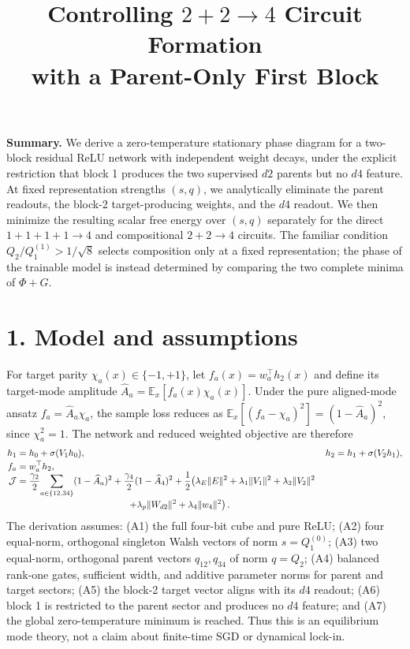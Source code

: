 \documentclass[10pt]{article}
\title{\vspace{-1.3cm}\textbf{Controlling $2+2\!\to\!4$ Circuit Formation\\
with a Parent-Only First Block}}
\author{}
\date{\vspace{-1.15cm}}
\begin{document}
\maketitle
\vspace{-0.75cm}

\textbf{Summary.}
We derive a zero-temperature stationary phase diagram for a two-block residual ReLU network
with independent weight decays, under the explicit restriction that block 1 produces the two
supervised $d2$ parents but no $d4$ feature.  At fixed representation strengths $(s,q)$, we
analytically eliminate the parent readouts, the block-2 target-producing weights, and the $d4$
readout.  We then minimize the resulting scalar free energy over $(s,q)$ separately for the
direct $1+1+1+1\to4$ and compositional $2+2\to4$ circuits.  The familiar condition
$Q_2/Q_1^{(1)}>1/\sqrt8$ selects composition only at a fixed representation; the phase of the
trainable model is instead determined by comparing the two complete minima of $\Phi+G$.

\section*{1. Model and assumptions}
For target parity $\chi_a(x)\in\{-1,+1\}$, let $f_a(x)=w_a^\top h_2(x)$ and define its
target-mode amplitude $\widehat A_a=\mathbb E_x[f_a(x)\chi_a(x)]$.  Under the pure aligned-mode
ansatz $f_a=\widehat A_a\chi_a$, the sample loss reduces as
$\mathbb E_x[(f_a-\chi_a)^2]=(1-\widehat A_a)^2$, since $\chi_a^2=1$.  The network and
reduced weighted objective are therefore
\begin{align}
h_1&=h_0+\sigma(V_1h_0),& h_2&=h_1+\sigma(V_2h_1),\nonumber\\[-2pt]
f_a&=w_a^\top h_2,\nonumber\\[-5pt]
\mathcal J&=\frac{\gamma_2}{2}\!\sum_{a\in\{12,34\}}(1-\widehat A_a)^2
+\frac{\gamma_4}{2}(1-\widehat A_4)^2
+\frac12\!\left(\lambda_E\|E\|^2+\lambda_1\|V_1\|^2+\lambda_2\|V_2\|^2\right.\nonumber\\[-2pt]
&\hspace{4.2cm}\left.+\lambda_p\|W_{d2}\|^2+\lambda_4\|w_4\|^2\right).
\label{eq:objective}
\end{align}
The derivation assumes: (A1) the full four-bit cube and pure ReLU; (A2) four equal-norm,
orthogonal singleton Walsh vectors of norm $s=Q_1^{(0)}$; (A3) two equal-norm, orthogonal
parent vectors $q_{12},q_{34}$ of norm $q=Q_2$; (A4) balanced rank-one gates, sufficient
width, and additive parameter norms for parent and target sectors; (A5) the block-2 target
vector aligns with its $d4$ readout; (A6) block 1 is restricted to the parent sector and
produces no $d4$ feature; and (A7) the global zero-temperature minimum is reached.  Thus this is an equilibrium
mode theory, not a claim about finite-time SGD or dynamical lock-in.
\end{document}
